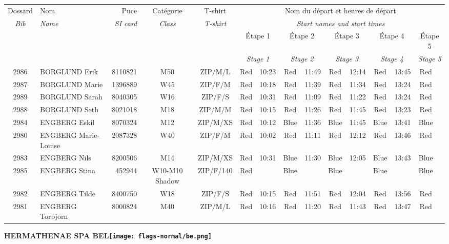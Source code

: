 \documentclass{report}
\begin{document}
  \begin{longtable}{|c|l|r|c|c|*{5}{cc|}}
    Dossard & Nom  & Puce    & Catégorie & T-shirt & \multicolumn{10}{c|}{Nom du départ et heures de départ} \\
    \itshape Bib     & \itshape Name & \itshape SI card & \itshape Class  & \itshape  T-shirt  & \multicolumn{10}{c|}{\itshape Start names and start times} \\
    \hline
    & & & & & \multicolumn{2}{c|}{Étape 1} & \multicolumn{2}{c|}{Étape 2} & \multicolumn{2}{c|}{Étape 3} & \multicolumn{2}{c|}{Étape 4} & \multicolumn{2}{c|}{Étape 5} \\
    & & & & & \multicolumn{2}{c|}{\itshape Stage 1} & \multicolumn{2}{c|}{\itshape Stage 2} & \multicolumn{2}{c|}{\itshape Stage 3} & \multicolumn{2}{c|}{\itshape Stage 4} & \multicolumn{2}{c|}{\itshape Stage 5} \\
    \hline
    2986 & BORGLUND Erik & 8110821 & M50 & ZIP/M/L & Red & 10:23 & Red & 11:49 & Red & 12:14 & Red & 13:45 & Red &  \\
    2987 & BORGLUND Marie & 1396889 & W45 & ZIP/F/M & Red & 10:18 & Red & 11:39 & Red & 11:34 & Red & 13:24 & Red &  \\
    2989 & BORGLUND Sarah & 8040305 & W16 & ZIP/F/S & Red & 10:31 & Red & 11:09 & Red & 11:22 & Red & 13:24 & Red &  \\
    2988 & BORGLUND Seth & 8021018 & M18 & ZIP/M/M & Red & 10:15 & Red & 11:26 & Red & 11:45 & Red & 13:23 & Red &  \\
    2984 & ENGBERG Eskil & 8070324 & M12 & ZIP/M/XS & Red & 10:12 & Blue & 11:36 & Blue & 11:45 & Blue & 13:41 & Blue &  \\
    2980 & ENGBERG Marie-Louise & 2087328 & W40 & ZIP/F/M & Red & 10:02 & Red & 11:11 & Red & 12:12 & Red & 13:46 & Red &  \\
    2983 & ENGBERG Nils & 8200506 & M14 & ZIP/M/XS & Red & 10:31 & Blue & 11:30 & Blue & 12:05 & Blue & 13:43 & Blue &  \\
    2985 & ENGBERG Stina & 452944 & W10-M10 Shadow & ZIP/F/140 & Red &   & Blue &   & Blue &   & Blue &   & Blue &  \\
    2982 & ENGBERG Tilde & 8400750 & W18 & ZIP/F/S & Red & 10:15 & Red & 11:51 & Red & 12:04 & Red & 13:56 & Red &  \\
    2981 & ENGBERG Torbjorn & 8000824 & M40 & ZIP/M/L & Red & 10:16 & Red & 11:20 & Red & 11:43 & Red & 13:47 & Red &  \\
  \end{longtable}
\newpage
  \Huge \centering \bfseries HERMATHENAE SPA  BEL\normalfont \footnotesize \sffamily \hfill \texttt{[image: flags-normal/be.png]} \newline 
\end{document}
